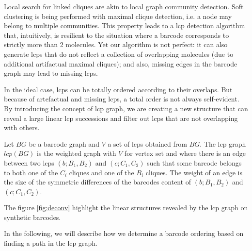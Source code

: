 Local search for linked cliques are akin to local graph community detection.
Soft clustering is being performed with maximal clique detection, i.e. a node may belong to multiple communities.
This property leads to a lcp detection algorithm that, intuitively, is resilient to the situation where a barcode corresponds to strictly more than 2 molecules. Yet our algorithm is not perfect: it can also generate lcps that do not reflect a collection of overlapping molecules (due to additional artifactual maximal cliques); and also, missing edges in the barcode graph may lead to missing lcps.

In the ideal case, lcps can be totally ordered according to their overlaps. But because of artefactual and missing lcps, a total order is not always self-evident.
By introducing the concept of lcp graph, we are creating a new structure that can reveal a large linear lcp successions and filter out lcps that are not overlapping with others.

\begin{definition}
    \label{def:lcp_graph}
    Let $BG$ be a barcode graph and $V$ a set of lcps obtained from $BG$. The lcp graph $lcp(BG)$ is the weighted graph with $V$ for vertex set and where there is an edge between two lcps $(b;B_1,B_2)$ and $(c;C_1,C_2)$ such that some barcode belongs to both one of the $C_i$ cliques and one of the $B_i$ cliques. The weight of an edge is the size of the symmetric differences of the barcodes content of $(b;B_1,B_2)$ and $(c;C_1,C_2)$. 
\end{definition}

The figure \ref{fig:deconv} highlight the linear structures revealed by the lcp graph on synthetic barcodes.

In the following, we will describe how we determine a barcode ordering based on finding a path in the lcp graph.




